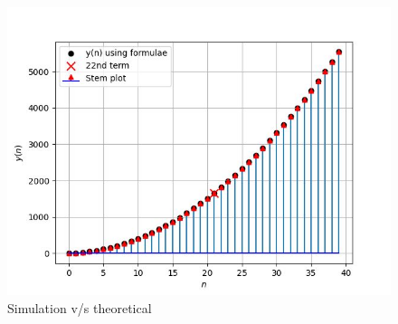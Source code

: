 \documentclass[journal,12pt,twocolumn]{IEEEtran}
\theoremstyle{remark}
\begin{document}
\begin{enumerate}
\begin{figure}[h]
\includegraphics[width=\columnwidth]{ncert-maths/10/5/3/7/fig/plot.png}

\begin{center}
    \caption{Simulation v/s theoretical}
\end{center}
    
    \label{fig:}
\end{figure}


\end{enumerate}
\end{document}
